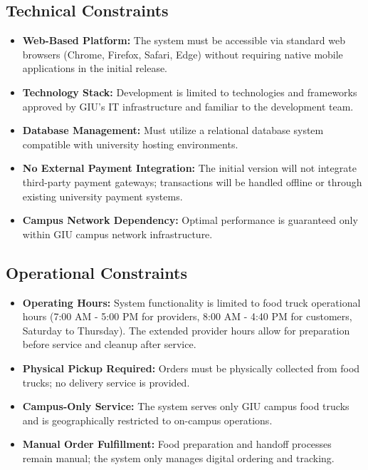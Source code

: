 \documentclass[12pt,a4paper]{article}
\begin{document}
\subsection{Technical Constraints}
\begin{itemize}[leftmargin=2em, itemsep=8pt]
    \item \textbf{Web-Based Platform:} The system must be accessible via standard web browsers (Chrome, Firefox, Safari, Edge) without requiring native mobile applications in the initial release.
    \item \textbf{Technology Stack:} Development is limited to technologies and frameworks approved by GIU's IT infrastructure and familiar to the development team.
    \item \textbf{Database Management:} Must utilize a relational database system compatible with university hosting environments.
    \item \textbf{No External Payment Integration:} The initial version will not integrate third-party payment gateways; transactions will be handled offline or through existing university payment systems.
    \item \textbf{Campus Network Dependency:} Optimal performance is guaranteed only within GIU campus network infrastructure.
\end{itemize}

\subsection{Operational Constraints}
\begin{itemize}[leftmargin=2em, itemsep=8pt]
    \item \textbf{Operating Hours:} System functionality is limited to food truck operational hours (7:00 AM - 5:00 PM for providers, 8:00 AM - 4:40 PM for customers, Saturday to Thursday). The extended provider hours allow for preparation before service and cleanup after service.
    \item \textbf{Physical Pickup Required:} Orders must be physically collected from food trucks; no delivery service is provided.
    \item \textbf{Campus-Only Service:} The system serves only GIU campus food trucks and is geographically restricted to on-campus operations.
    \item \textbf{Manual Order Fulfillment:} Food preparation and handoff processes remain manual; the system only manages digital ordering and tracking.
\end{itemize}
\end{document}

